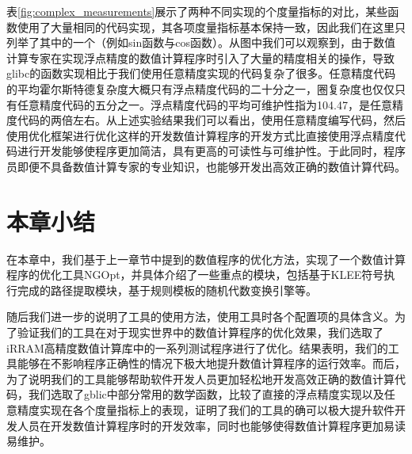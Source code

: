 表\ref{fig:complex_measurements}展示了两种不同实现的个度量指标的对比，某些函数使用了大量相同的代码实现，其各项度量指标基本保持一致，因此我们在这里只列举了其中的一个（例如sin函数与cos函数）。从图中我们可以观察到，由于数值计算专家在实现浮点精度的数值计算程序时引入了大量的精度相关的操作，导致glibc的函数实现相比于我们使用任意精度实现的代码复杂了很多。任意精度代码的平均霍尔斯特德复杂度大概只有浮点精度代码的二十分之一，圈复杂度也仅仅只有任意精度代码的五分之一。浮点精度代码的平均可维护性指为104.47，是任意精度代码的两倍左右。从上述实验结果我们可以看出，使用任意精度编写代码，然后使用优化框架进行优化这样的开发数值计算程序的开发方式比直接使用浮点精度代码进行开发能够使程序更加简洁，具有更高的可读性与可维护性。于此同时，程序员即便不具备数值计算专家的专业知识，也能够开发出高效正确的数值计算代码。

\section{本章小结}

在本章中，我们基于上一章节中提到的数值程序的优化方法，实现了一个数值计算程序的优化工具NGOpt，并具体介绍了一些重点的模块，包括基于KLEE符号执行完成的路径提取模块，基于规则模板的随机代数变换引擎等。

随后我们进一步的说明了工具的使用方法，使用工具时各个配置项的具体含义。为了验证我们的工具在对于现实世界中的数值计算程序的优化效果，我们选取了iRRAM高精度数值计算库中的一系列测试程序进行了优化。结果表明，我们的工具能够在不影响程序正确性的情况下极大地提升数值计算程序的运行效率。而后，为了说明我们的工具能够帮助软件开发人员更加轻松地开发高效正确的数值计算代码，我们选取了gblic中部分常用的数学函数，比较了直接的浮点精度实现以及任意精度实现在各个度量指标上的表现，证明了我们的工具的确可以极大提升软件开发人员在开发数值计算程序时的开发效率，同时也能够使得数值计算程序更加易读易维护。